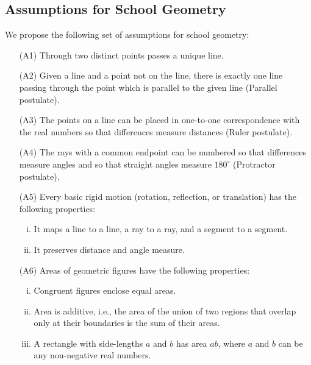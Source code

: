\subsection{Assumptions for School Geometry}
We propose the following set of assumptions for school geometry:  
{\small
\begin{itemize}
\item[(A1)] Through two distinct points passes a unique line.
\item[(A2)] Given a line and a point not on the line, there is exactly one line passing through the point which is parallel to the given line (Parallel postulate).
\item[(A3)] The points on a line can be placed in one-to-one correspondence with the real numbers so that differences measure distances (Ruler postulate).  
\item[(A4)] The rays with a common endpoint can be numbered so that differences measure angles and so that straight angles measure $180^\circ$ (Protractor postulate). 
\item[(A5)] Every basic rigid motion (rotation, reflection, or translation) has the following properties:
\begin{enumerate}[(i)]\parskip0pt
\item It maps a line to a line, a ray to a ray, and a segment to a segment.
\item It preserves distance and angle measure.
\end{enumerate}
\item [(A6)] Areas of geometric figures have the following properties: 
\begin{enumerate}[(i)]%
\item Congruent figures enclose equal areas.
\item Area is additive, i.e., the area of the union of two regions that overlap only at their boundaries is the sum of their areas. 
\item A rectangle with side-lengths $a$ and $b$ has area $ab$, where $a$ and $b$ can be any non-negative real numbers.
\end{enumerate}

\end{itemize}
}

